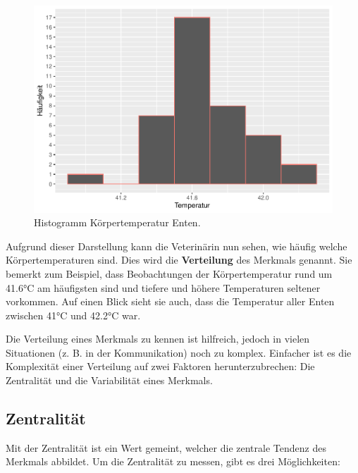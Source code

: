 \documentclass[
]{book}
\theoremstyle{definition}
\theoremstyle{definition}
\theoremstyle{definition}
\theoremstyle{definition}
\theoremstyle{remark}
\begin{document}
\begin{figure}

{\centering \includegraphics{aps_statistik1_files/figure-latex/exm-ducktemp-histogramm-1} 

}

\caption{Histogramm Körpertemperatur Enten.}\label{fig:exm-ducktemp-histogramm}
\end{figure}

Aufgrund dieser Darstellung kann die Veterinärin nun sehen, wie häufig welche Körpertemperaturen sind. Dies wird die \textbf{Verteilung} des Merkmals genannt. Sie bemerkt zum Beispiel, dass Beobachtungen der Körpertemperatur rund um 41.6°C am häufigsten sind und tiefere und höhere Temperaturen seltener vorkommen. Auf einen Blick sieht sie auch, dass die Temperatur aller Enten zwischen 41°C und 42.2°C war.

Die Verteilung eines Merkmals zu kennen ist hilfreich, jedoch in vielen Situationen (z. B. in der Kommunikation) noch zu komplex. Einfacher ist es die Komplexität einer Verteilung auf zwei Faktoren herunterzubrechen: Die Zentralität und die Variabilität eines Merkmals.

\subsection{Zentralität}\label{zentralitaet}

Mit der Zentralität ist ein Wert gemeint, welcher die zentrale Tendenz des Merkmals abbildet. Um die Zentralität zu messen, gibt es drei Möglichkeiten:
\end{document}
